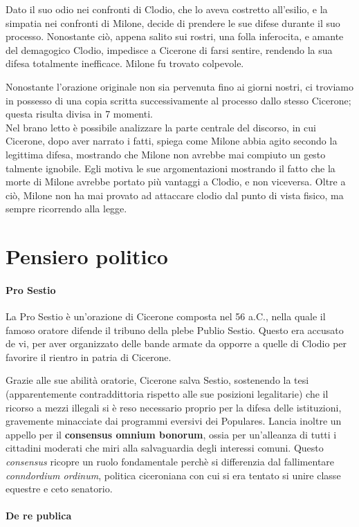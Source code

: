 \documentclass[10pt,a4paper]{article}
\begin{document}
Dato il suo odio nei confronti di Clodio, che lo aveva costretto all'esilio, e la simpatia nei confronti di Milone, decide di prendere le sue difese durante il suo processo. Nonostante ciò, appena salito sui rostri, una folla inferocita, e amante del demagogico Clodio, impedisce a Cicerone di farsi sentire, rendendo la sua difesa totalmente inefficace. Milone fu trovato colpevole.

Nonostante l'orazione originale non sia pervenuta fino ai giorni nostri, ci troviamo in possesso di una copia scritta successivamente al processo dallo stesso Cicerone; questa risulta divisa in 7 momenti.\\

Nel brano letto è possibile analizzare la parte centrale del discorso, in cui Cicerone, dopo aver narrato i fatti, spiega come Milone abbia agito secondo la legittima difesa, mostrando che Milone non avrebbe mai compiuto un gesto talmente ignobile. Egli motiva le sue argomentazioni mostrando il fatto che la morte di Milone avrebbe portato più vantaggi a Clodio, e non viceversa. Oltre a ciò, Milone non ha mai provato ad attaccare clodio dal punto di vista fisico, ma sempre ricorrendo alla legge. 

\part*{Pensiero politico}

\subsection*{Pro Sestio}

La Pro Sestio è un'orazione di Cicerone composta nel 56 a.C., nella quale il famoso oratore difende il tribuno della plebe Publio Sestio. Questo era accusato de vi, per aver organizzato delle bande armate da opporre a quelle di Clodio per favorire il rientro in patria di Cicerone.

Grazie alle sue abilità oratorie, Cicerone salva Sestio, sostenendo la tesi (apparentemente contraddittoria rispetto alle sue posizioni legalitarie) che il ricorso a mezzi illegali si è reso necessario proprio per la difesa delle istituzioni, gravemente minacciate dai programmi eversivi dei Populares. Lancia inoltre un appello per il \textbf{consensus omnium bonorum}, ossia per un'alleanza di tutti i cittadini moderati che miri alla salvaguardia degli interessi comuni. Questo \textit{consensus} ricopre un ruolo fondamentale perchè si differenzia dal fallimentare \textit{conndordium ordinum}, politica ciceroniana con cui si era tentato si unire classe equestre e ceto senatorio.

\subsection*{De re publica}
\end{document}
